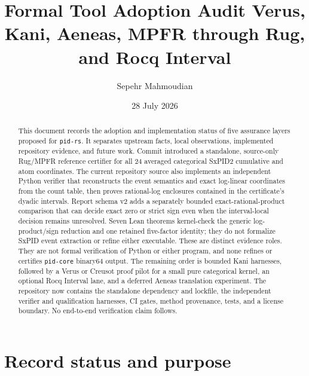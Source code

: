 \documentclass[11pt]{article}
\title{\PidReportTitle
  {Formal Tool Adoption Audit}
  {Verus, Kani, Aeneas, MPFR through Rug, and Rocq Interval}}
\author{Sepehr Mahmoudian}
\date{28 July 2026}
\begin{document}
\PidMakeTitle

\begin{abstract}
This document records the adoption and implementation status of five assurance layers proposed for
\texttt{pid-rs}.  It separates upstream facts, local observations, implemented repository evidence,
and future work.  Commit
 introduced a standalone, source-only Rug/MPFR
reference certifier for all 24 averaged categorical SxPID2 cumulative and atom coordinates.  The
current repository source also implements an independent Python verifier that reconstructs the
event semantics and exact log-linear coordinates from the count table, then proves rational-log
enclosures contained in the certificate's dyadic intervals.  Report schema v2 adds a separately
bounded exact-rational-product comparison that can decide exact zero or strict sign even when the
interval-local decision remains unresolved.  Seven Lean theorems kernel-check the generic
log-product/sign reduction and one retained five-factor identity; they do not formalize SxPID event
extraction or refine either executable.  These are distinct evidence roles.  They are not formal
verification of Python or either program, and none refines or certifies \texttt{pid-core} binary64
output.  The remaining order is bounded Kani harnesses, followed by a Verus or Creusot proof pilot
for a small pure categorical kernel, an optional Rocq Interval lane, and a deferred Aeneas
translation experiment.  The repository now contains the standalone dependency and lockfile, the
independent verifier and qualification harnesses, CI gates, method provenance, tests, and a license
boundary.  No end-to-end verification claim follows.
\end{abstract}

\begingroup
\small
\setlength{\parskip}{0pt}
\tableofcontents
\endgroup

\section{Record status and purpose}
\end{document}
